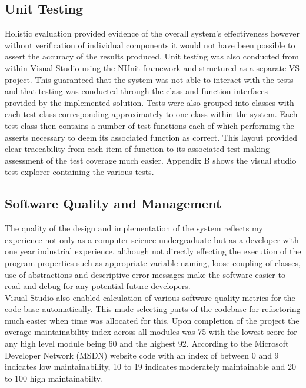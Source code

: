\subsection{Unit Testing}
Holistic evaluation provided evidence of the overall system's effectiveness however without verification of individual components it would not have been possible to assert the accuracy of the results produced. Unit testing was also conducted from within Visual Studio using the NUnit framework and structured as a separate VS project. This guaranteed that the system was not able to interact with the tests and that testing was conducted through the class and function interfaces provided by the implemented solution. Tests were also grouped into classes with each test class corresponding approximately to one class within the system. Each test class then contains a number of test functions each of which performing the asserts necessary to deem its associated function as correct. This layout provided clear traceability from each item of function to its associated test making assessment of the test coverage much easier. Appendix B shows the visual studio test explorer containing the various tests. \\


\subsection{Software Quality and Management}
The quality of the design and implementation of the system reflects my experience not only as a computer science undergraduate but as a developer with one year industrial experience, although not directly effecting the execution of the program properties such as appropriate variable naming, loose coupling of classes, use of abstractions and descriptive error messages make the software easier to read and debug for any potential future developers. \\

\noindent
Visual Studio also enabled calculation of various software quality metrics for the code base automatically. This made selecting parts of the codebase for refactoring much easier when time was allocated for this. Upon completion of the project the average maintainability index \cite{VisualStudioMaintainIndex} across all modules was 75 with the lowest score for any high level module being 60 and the highest 92. According to the Microsoft Developer Network (MSDN) website code with an index of between 0 and 9 indicates low maintainability, 10 to 19 indicates moderately maintainable and 20 to 100 high maintainabilty. \\

